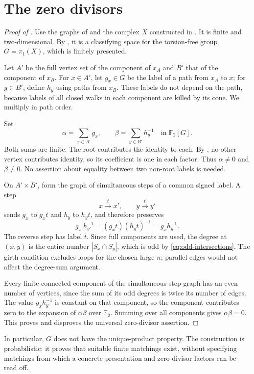 \section{The zero divisors}\label{sec:factors}

\begin{proof}[Proof of ]
Use the graphs of  and the complex \(X\) constructed in . It is finite and two-dimensional. By , it is a classifying space for the torsion-free group \(G=\pi_1(X)\), which is finitely presented.

Let \(A'\) be the full vertex set of the component of \(x_A\) and \(B'\) that of the component of \(x_B\). For \(x\in A'\), let \(g_x\in G\) be the label of a path from \(x_A\) to \(x\); for \(y\in B'\), define \(h_y\) using paths from \(x_B\). These labels do not depend on the path, because labels of all closed walks in each component are killed by its cone. We multiply in path order.

Set
\[
\alpha=\sum_{x\in A'}g_x,\qquad
\beta=\sum_{y\in B'}h_y^{-1}
\quad\text{in }\mathbb F_2[G].
\]
Both sums are finite. The root contributes the identity to each. By , no other vertex contributes identity, so its coefficient is one in each factor. Thus \(\alpha\ne0\) and \(\beta\ne0\). No assertion about equality between two non-root labels is needed.

On \(A'\times B'\), form the graph of simultaneous steps of a common signed label. A step
\[
x\xrightarrow{t}x',\qquad y\xrightarrow{t}y'
\]
sends \(g_x\) to \(g_xt\) and \(h_y\) to \(h_yt\), and therefore preserves
\[
g_{x'}h_{y'}^{-1}
 =(g_xt)(h_yt)^{-1}
 =g_xh_y^{-1}.
\]
The reverse step has label \(\bar t\). Since full components are used, the degree at \((x,y)\) is the entire number \(|S_x\cap S_y|\), which is odd by \eqref{eq:odd-intersections}. The girth condition excludes loops for the chosen large \(n\); parallel edges would not affect the degree-sum argument.

Every finite connected component of the simultaneous-step graph has an even number of vertices, since the sum of its odd degrees is twice its number of edges. The value \(g_xh_y^{-1}\) is constant on that component, so the component contributes zero to the expansion of \(\alpha\beta\) over \(\mathbb F_2\). Summing over all components gives \(\alpha\beta=0\). This proves  and disproves the universal zero-divisor assertion.
\end{proof}

In particular, \(G\) does not have the unique-product property. The construction
is probabilistic: it proves that suitable finite matchings exist, without
specifying matchings from which a concrete presentation and zero-divisor
factors can be read off.
